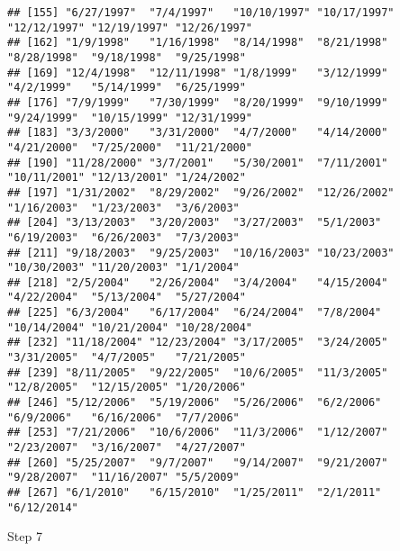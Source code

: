 \documentclass[]{article}
\newenvironment{Shaded}{\begin{snugshade}}{\end{snugshade}}
\newcommand{\KeywordTok}[1]{\textcolor[rgb]{0.13,0.29,0.53}{\textbf{#1}}}
\newcommand{\DataTypeTok}[1]{\textcolor[rgb]{0.13,0.29,0.53}{#1}}
\newcommand{\DecValTok}[1]{\textcolor[rgb]{0.00,0.00,0.81}{#1}}
\newcommand{\StringTok}[1]{\textcolor[rgb]{0.31,0.60,0.02}{#1}}
\newcommand{\OperatorTok}[1]{\textcolor[rgb]{0.81,0.36,0.00}{\textbf{#1}}}
\newcommand{\NormalTok}[1]{#1}
\begin{document}
\begin{verbatim}
## [155] "6/27/1997"  "7/4/1997"   "10/10/1997" "10/17/1997" "12/12/1997" "12/19/1997" "12/26/1997"
## [162] "1/9/1998"   "1/16/1998"  "8/14/1998"  "8/21/1998"  "8/28/1998"  "9/18/1998"  "9/25/1998" 
## [169] "12/4/1998"  "12/11/1998" "1/8/1999"   "3/12/1999"  "4/2/1999"   "5/14/1999"  "6/25/1999" 
## [176] "7/9/1999"   "7/30/1999"  "8/20/1999"  "9/10/1999"  "9/24/1999"  "10/15/1999" "12/31/1999"
## [183] "3/3/2000"   "3/31/2000"  "4/7/2000"   "4/14/2000"  "4/21/2000"  "7/25/2000"  "11/21/2000"
## [190] "11/28/2000" "3/7/2001"   "5/30/2001"  "7/11/2001"  "10/11/2001" "12/13/2001" "1/24/2002" 
## [197] "1/31/2002"  "8/29/2002"  "9/26/2002"  "12/26/2002" "1/16/2003"  "1/23/2003"  "3/6/2003"  
## [204] "3/13/2003"  "3/20/2003"  "3/27/2003"  "5/1/2003"   "6/19/2003"  "6/26/2003"  "7/3/2003"  
## [211] "9/18/2003"  "9/25/2003"  "10/16/2003" "10/23/2003" "10/30/2003" "11/20/2003" "1/1/2004"  
## [218] "2/5/2004"   "2/26/2004"  "3/4/2004"   "4/15/2004"  "4/22/2004"  "5/13/2004"  "5/27/2004" 
## [225] "6/3/2004"   "6/17/2004"  "6/24/2004"  "7/8/2004"   "10/14/2004" "10/21/2004" "10/28/2004"
## [232] "11/18/2004" "12/23/2004" "3/17/2005"  "3/24/2005"  "3/31/2005"  "4/7/2005"   "7/21/2005" 
## [239] "8/11/2005"  "9/22/2005"  "10/6/2005"  "11/3/2005"  "12/8/2005"  "12/15/2005" "1/20/2006" 
## [246] "5/12/2006"  "5/19/2006"  "5/26/2006"  "6/2/2006"   "6/9/2006"   "6/16/2006"  "7/7/2006"  
## [253] "7/21/2006"  "10/6/2006"  "11/3/2006"  "1/12/2007"  "2/23/2007"  "3/16/2007"  "4/27/2007" 
## [260] "5/25/2007"  "9/7/2007"   "9/14/2007"  "9/21/2007"  "9/28/2007"  "11/16/2007" "5/5/2009"  
## [267] "6/1/2010"   "6/15/2010"  "1/25/2011"  "2/1/2011"   "6/12/2014"
\end{verbatim}

Step 7

\begin{Shaded}
\end{Shaded}
\end{document}
